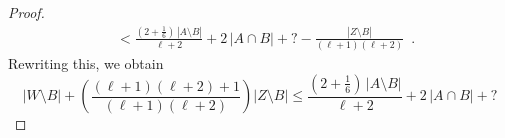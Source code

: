 \documentclass{patmorin}
\newcommand{\pat}[1]{\textcolor{Blue}{[Pat: #1]}}
\begin{document}
\begin{proof}
\begin{align*}
    & < \frac{(2+\tfrac{1}{6})\,|A\setminus B|}{\ell+2} + 2\,|A\cap B|
    +{?} -\frac{|Z\setminus B|}{(\ell+1)(\ell+2)} \enspace .
  \end{align*}
  Rewriting this, we obtain
  \[
  |W\setminus B|+\left(\frac{(\ell+1)(\ell+2)+1}{(\ell+1)(\ell+2)}\right)|Z\setminus B|
   \le \frac{(2+\tfrac{1}{6})\,|A\setminus B|}{\ell+2} + 2\,|A\cap B|
  +{?}
  \]
\end{proof}




\end{document}
